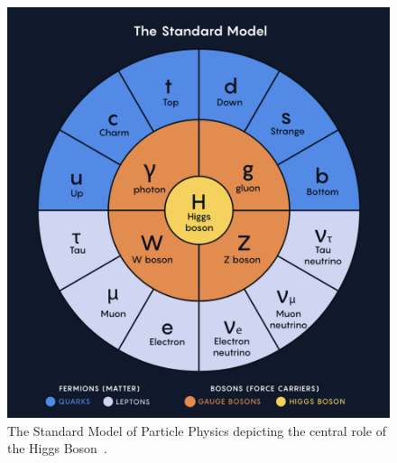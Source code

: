 \begin{figure}
    \centering
    \includegraphics[scale=0.7]{fig/SM.png}
    \caption{The Standard Model of Particle Physics depicting the central role of the Higgs Boson~\cite{QuantaMagNewMap}.}
    \label{fig:SMDiagram}
\end{figure}





